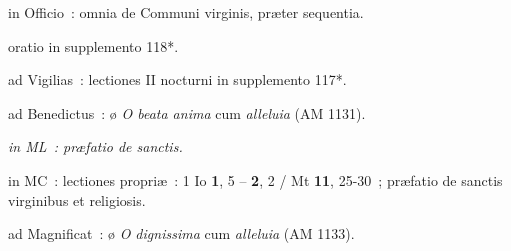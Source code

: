 {{\item in Officio~: omnia de Communi virginis, præter sequentia.
\item oratio in supplemento 118*.
\item ad Vigilias~: lectiones II nocturni in supplemento 117*.
\item ad Benedictus~: ø \textit{O beata anima} cum \textit{alleluia} (AM 1131).
\item \textit{in ML~: præfatio de sanctis.}
\item in MC~: lectiones propriæ~: 1 Io \textbf{1}, 5 – \textbf{2}, 2 / Mt \textbf{11}, 25-30~; præfatio de sanctis virginibus et religiosis.
\item ad Magnificat~: ø \textit{O dignissima} cum \textit{alleluia} (AM 1133).}

}
